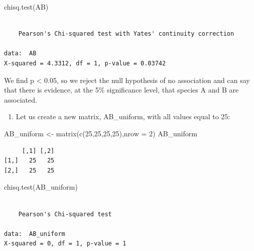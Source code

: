 \documentclass[
  letterpaper,
  DIV=11,
  numbers=noendperiod]{scrreprt}
\newenvironment{Shaded}{\begin{snugshade}}{\end{snugshade}}
\newcommand{\AttributeTok}[1]{\textcolor[rgb]{0.40,0.45,0.13}{#1}}
\newcommand{\DecValTok}[1]{\textcolor[rgb]{0.68,0.00,0.00}{#1}}
\newcommand{\FunctionTok}[1]{\textcolor[rgb]{0.28,0.35,0.67}{#1}}
\newcommand{\NormalTok}[1]{\textcolor[rgb]{0.00,0.23,0.31}{#1}}
\newcommand{\OtherTok}[1]{\textcolor[rgb]{0.00,0.23,0.31}{#1}}
\providecommand{\tightlist}{%
  \setlength{\itemsep}{0pt}\setlength{\parskip}{0pt}}\usepackage{longtable,booktabs,array}
\begin{document}
\begin{Shaded}
\begin{Highlighting}[]
\FunctionTok{chisq.test}\NormalTok{(AB)}
\end{Highlighting}
\end{Shaded}

\begin{verbatim}

    Pearson's Chi-squared test with Yates' continuity correction

data:  AB
X-squared = 4.3312, df = 1, p-value = 0.03742
\end{verbatim}

We find p \textless{} 0.05, so we reject the null hypothesis of no
association and can say that there is evidence, at the 5\% significance
level, that species A and B are associated.

\begin{enumerate}
\def\labelenumi{\arabic{enumi}.}
\setcounter{enumi}{3}
\tightlist
\item
  Let us create a new matrix, AB\_uniform, with all values equal to 25:
\end{enumerate}

\begin{Shaded}
\begin{Highlighting}[]
\NormalTok{AB\_uniform }\OtherTok{\textless{}{-}} \FunctionTok{matrix}\NormalTok{(}\FunctionTok{c}\NormalTok{(}\DecValTok{25}\NormalTok{,}\DecValTok{25}\NormalTok{,}\DecValTok{25}\NormalTok{,}\DecValTok{25}\NormalTok{),}\AttributeTok{nrow =} \DecValTok{2}\NormalTok{)}
\NormalTok{AB\_uniform}
\end{Highlighting}
\end{Shaded}

\begin{verbatim}
     [,1] [,2]
[1,]   25   25
[2,]   25   25
\end{verbatim}

\begin{Shaded}
\begin{Highlighting}[]
\FunctionTok{chisq.test}\NormalTok{(AB\_uniform)}
\end{Highlighting}
\end{Shaded}

\begin{verbatim}

    Pearson's Chi-squared test

data:  AB_uniform
X-squared = 0, df = 1, p-value = 1
\end{verbatim}
\end{document}
